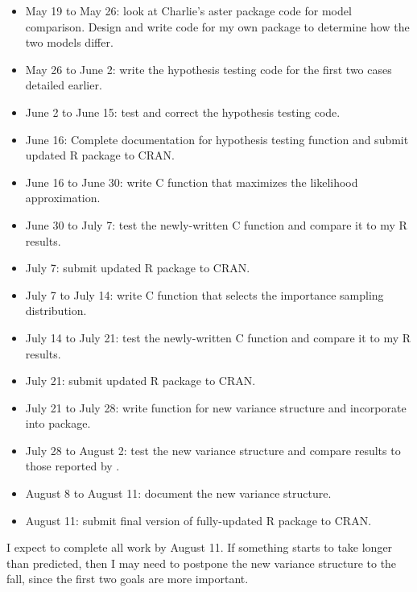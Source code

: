 \documentclass[12pt]{article}
\begin{document}
\begin{itemize}
\item[] May 19 to May 26: look at Charlie's aster package code for model comparison. Design and write code for my own package to determine how the two models differ.
\item[] May 26 to June 2: write the hypothesis testing code for the first two cases detailed earlier.
\item[] June 2 to June 15: test and correct the hypothesis testing code.
\item[] June 16: Complete documentation for hypothesis testing function and submit updated R package to CRAN.
\item[] June 16 to June 30: write C function that maximizes the likelihood approximation.
\item[] June 30 to July 7: test the newly-written C function and compare it to my R results. 
\item[] July 7:  submit updated R package to CRAN.
\item[] July 7 to July 14: write C function that selects the importance sampling distribution.
\item[]July 14 to July 21: test the newly-written C function and compare it to my R results.
\item[] July 21:  submit updated R package to CRAN.
\item[] July 21 to July 28: write function for new variance structure and incorporate into package.
\item[] July 28 to August 2: test the new variance structure and compare results to those reported by \citet{caffojj:2005}.
\item[] August 8 to August 11: document the new variance structure.
\item[] August 11: submit final version of fully-updated R package to CRAN.
\end{itemize}
I expect to complete all work by August 11. If something starts to take longer than predicted, then I may need to postpone the new variance structure to the fall, since the first two goals are more important.



\vspace{-2.3cm}
\renewcommand{\refname}{}


\end{document}
